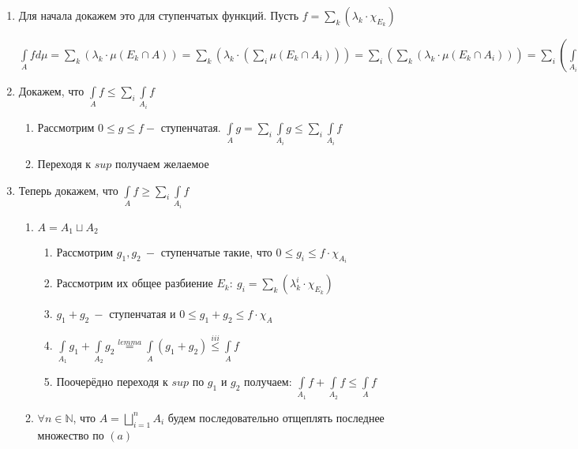 \documentclass[paper=a4, fontsize=17pt]{article}
\begin{document}
\begin{enumerate}
	\item Для начала докажем это для ступенчатых функций. Пусть $f = \sum\limits_{k} (\lambda_k \cdot \chi_{E_k})$

 $\int\limits_{A}fd\mu = \sum\limits_{k} (\lambda_k \cdot \mu(E_k \cap A)) =
 \sum\limits_{k} (\lambda_k \cdot (\sum\limits_{i} \mu(E_k \cap A_i))) =
 \sum\limits_{i}(\sum\limits_{k}(\lambda_k \cdot \mu(E_k \cap A_i))) = \sum\limits_{i}(\int\limits_{A_i}f)$

	\item Докажем, что $\int\limits_{A}f \leqslant \sum\limits_{i} \int\limits_{A_{i}}f$

	\begin{enumerate}
		\item Рассмотрим $0 \leqslant g \leqslant f - $ ступенчатая. $\int\limits_{A}g = \sum\limits_{i} \int\limits_{A_i}g \leqslant \sum\limits_{i} \int\limits_{A_{i}}f$

		 \item Переходя к $sup$ получаем желаемое
	\end{enumerate}

	\item Теперь докажем, что $\int\limits_{A}f \geqslant \sum\limits_{i} \int\limits_{A_{i}}f$
	\begin{enumerate}
		\item $A = A_1\sqcup A_2$

		\begin{enumerate}
			\item Рассмотрим $g_1, g_2\ -$ ступенчатые такие, что $0 \leqslant g_i \leqslant f \cdot \chi_{A_i}$

			\item Рассмотрим их общее разбиение $E_k:\ g_i = \sum\limits_k (\lambda_k^i \cdot \chi_{E_k})$

			\item $g_1 + g_2\ - $ ступенчатая и $0 \leqslant g_1 + g_2 \leqslant f \cdot \chi_{A}$

			\item $\int\limits_{A_1}g_1 + \int\limits_{A_2}g_2 \stackrel{lemma}{=} \int\limits_{A}(g_1 + g_2) \stackrel{iii}{\leqslant} \int\limits_{A}f$

			\item Поочерёдно переходя к $sup$ по $g_1$ и $g_2$ получаем: $\int\limits_{A_1}f + \int\limits_{A_2}f \leqslant \int\limits_{A}f$
		\end{enumerate}

	\item $\forall n \in \mathbb{N}$, что $A = \bigsqcup\limits_{i=1}^{n}A_{i}$ будем последовательно отщеплять последнее множество по $(a)$


\end{enumerate}
\end{enumerate}
\end{document}

